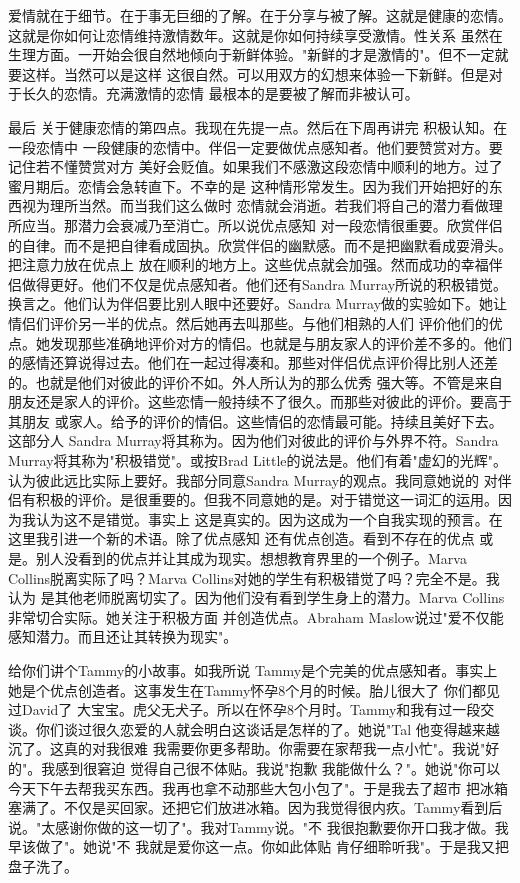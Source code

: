 爱情就在于细节。在于事无巨细的了解。在于分享与被了解。这就是健康的恋情。这就是你如何让恋情维持激情数年。这就是你如何持续享受激情。性关系 虽然在生理方面。一开始会很自然地倾向于新鲜体验。"新鲜的才是激情的"。但不一定就要这样。当然可以是这样 这很自然。可以用双方的幻想来体验一下新鲜。但是对于长久的恋情。充满激情的恋情 最根本的是要被了解而非被认可。 

最后 关于健康恋情的第四点。我现在先提一点。然后在下周再讲完 积极认知。在一段恋情中 一段健康的恋情中。伴侣一定要做优点感知者。他们要赞赏对方。要记住若不懂赞赏对方 美好会贬值。如果我们不感激这段恋情中顺利的地方。过了蜜月期后。恋情会急转直下。不幸的是 这种情形常发生。因为我们开始把好的东西视为理所当然。而当我们这么做时 恋情就会消逝。若我们将自己的潜力看做理所应当。那潜力会衰减乃至消亡。所以说优点感知 对一段恋情很重要。欣赏伴侣的自律。而不是把自律看成固执。欣赏伴侣的幽默感。而不是把幽默看成耍滑头。把注意力放在优点上 放在顺利的地方上。这些优点就会加强。然而成功的幸福伴侣做得更好。他们不仅是优点感知者。他们还有Sandra Murray所说的积极错觉。换言之。他们认为伴侣要比别人眼中还要好。Sandra Murray做的实验如下。她让情侣们评价另一半的优点。然后她再去叫那些。与他们相熟的人们 评价他们的优点。她发现那些准确地评价对方的情侣。也就是与朋友家人的评价差不多的。他们的感情还算说得过去。他们在一起过得凑和。那些对伴侣优点评价得比别人还差的。也就是他们对彼此的评价不如。外人所认为的那么优秀 强大等。不管是来自朋友还是家人的评价。这些恋情一般持续不了很久。而那些对彼此的评价。要高于其朋友 或家人。给予的评价的情侣。这些情侣的恋情最可能。持续且美好下去。这部分人 Sandra Murray将其称为。因为他们对彼此的评价与外界不符。Sandra Murray将其称为"积极错觉"。或按Brad Little的说法是。他们有着"虚幻的光辉"。认为彼此远比实际上要好。我部分同意Sandra Murray的观点。我同意她说的 对伴侣有积极的评价。是很重要的。但我不同意她的是。对于错觉这一词汇的运用。因为我认为这不是错觉。事实上 这是真实的。因为这成为一个自我实现的预言。在这里我引进一个新的术语。除了优点感知 还有优点创造。看到不存在的优点 或是。别人没看到的优点并让其成为现实。想想教育界里的一个例子。Marva Collins脱离实际了吗？Marva Collins对她的学生有积极错觉了吗？完全不是。我认为 是其他老师脱离切实了。因为他们没有看到学生身上的潜力。Marva Collins非常切合实际。她关注于积极方面 并创造优点。Abraham Maslow说过"爱不仅能感知潜力。而且还让其转换为现实"。 

给你们讲个Tammy的小故事。如我所说 Tammy是个完美的优点感知者。事实上 她是个优点创造者。这事发生在Tammy怀孕8个月的时候。胎儿很大了 你们都见过David了 大宝宝。虎父无犬子。所以在怀孕8个月时。Tammy和我有过一段交谈。你们谈过很久恋爱的人就会明白这谈话是怎样的了。她说"Tal 他变得越来越沉了。这真的对我很难 我需要你更多帮助。你需要在家帮我一点小忙"。我说"好的"。我感到很窘迫 觉得自己很不体贴。我说"抱歉 我能做什么？"。她说"你可以今天下午去帮我买东西。我再也拿不动那些大包小包了"。于是我去了超市 把冰箱塞满了。不仅是买回家。还把它们放进冰箱。因为我觉得很内疚。Tammy看到后说。"太感谢你做的这一切了"。我对Tammy说。"不 我很抱歉要你开口我才做。我早该做了"。她说"不 我就是爱你这一点。你如此体贴 肯仔细聆听我"。于是我又把盘子洗了。 

